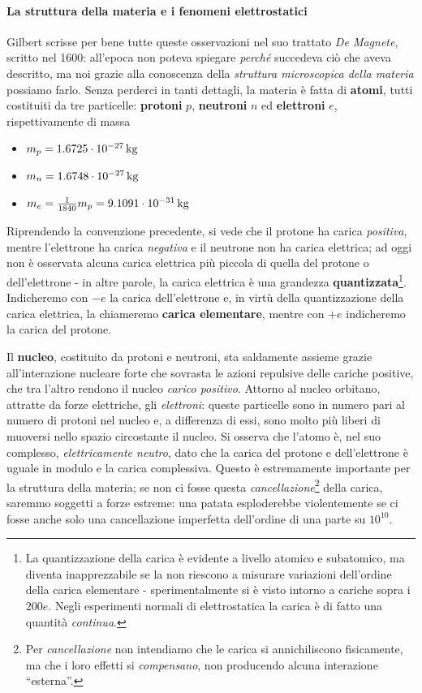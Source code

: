 \paragraph{La struttura della materia e i fenomeni elettrostatici}
Gilbert scrisse per bene tutte queste osservazioni nel suo trattato \textit{De Magnete}, scritto nel 1600: all'epoca non poteva spiegare \textit{perché} succedeva ciò che aveva descritto, ma noi grazie alla conoscenza della \textit{struttura microscopica della materia} possiamo farlo. Senza perderci in tanti dettagli, la materia è fatta di \textbf{atomi}, tutti costituiti da tre particelle: \textbf{protoni} $p$, \textbf{neutroni} $n$ ed \textbf{elettroni} $e$, rispettivamente di massa
\begin{itemize}
	\item $m_p = \SI[exponent-product=\ensuremath{\cdot}]{1.6725d-27}{\kilogram}$ 
	\item $m_n = \SI[exponent-product=\ensuremath{\cdot}]{1.6748d-27}{\kilogram}$
	\item $m_e = \frac{1}{1840}m_p=\SI[exponent-product=\ensuremath{\cdot}]{9,1091d-31}{\kilogram}$
\end{itemize}
Riprendendo la convenzione precedente, si vede che il protone ha carica \textit{positiva}, mentre l'elettrone ha carica \textit{negativa} e il neutrone non ha carica elettrica; ad oggi non è osservata alcuna carica elettrica più piccola di quella del protone o dell'elettrone - in altre parole, la carica elettrica è una grandezza \textbf{quantizzata}\footnote{La quantizzazione della carica è evidente a livello atomico e subatomico, ma diventa inapprezzabile se la non riescono a misurare variazioni dell'ordine della carica elementare - sperimentalmente si è visto intorno a cariche sopra i $200 e$. Negli esperimenti normali di elettrostatica la carica è di fatto una quantità \textit{continua}.}. Indicheremo con $-e$ la carica dell'elettrone e, in virtù della quantizzazione della carica elettrica, la chiameremo \textbf{carica elementare}, mentre con $+e$ indicheremo la carica del protone.

Il \textbf{nucleo}, costituito da protoni e neutroni, sta saldamente assieme grazie all'interazione nucleare forte che sovrasta le azioni repulsive delle cariche positive, che tra l'altro rendono il nucleo \textit{carico positivo}. Attorno al nucleo orbitano, attratte da forze elettriche, gli \textit{elettroni}: queste particelle sono in numero pari al numero di protoni nel nucleo e, a differenza di essi, sono molto più liberi di muoversi nello spazio circostante il nucleo. Si osserva che l'atomo è, nel suo complesso, \textit{elettricamente neutro}, dato che la carica del protone e dell'elettrone è uguale in modulo e la carica complessiva. Questo è estremamente importante per la struttura della materia; se non ci fosse questa \textit{cancellazione}\footnote{Per \textit{cancellazione} non intendiamo che le carica si annichiliscono fisicamente, ma che i loro effetti si \textit{compensano}, non producendo alcuna interazione ``esterna''.} della carica, saremmo soggetti a forze estreme: una patata esploderebbe violentemente se ci fosse anche solo una cancellazione imperfetta dell'ordine di una parte su $10^{10}$.

